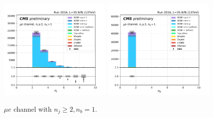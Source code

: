 \begin{figure}[ht]
    \includegraphics[width=0.49\textwidth]{chapters/Analysis/sectionPlots/figures/kinematics_pickles/emu/1b/emu_1b_nJets.pdf}
    \includegraphics[width=0.49\textwidth]{chapters/Analysis/sectionPlots/figures/kinematics_pickles/emu/1b/emu_1b_nBJets.pdf}
    
    \caption{$\mu e$ channel with $n_j\geq2, n_b=1$.}
\end{figure}

